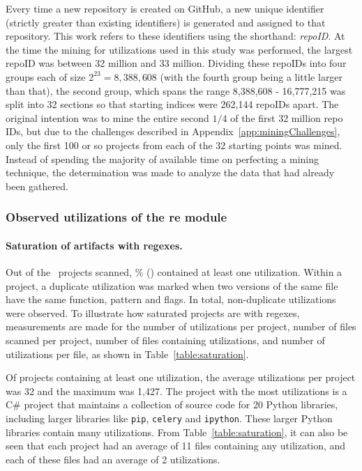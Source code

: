 Every time a new repository is created on GitHub, a new unique identifier (strictly greater than existing identifiers) is generated and assigned to that repository.  This work refers to these identifiers using the shorthand: \emph{repoID}.  At the time the mining for utilizations used in this study was performed, the largest repoID was between 32 million and 33 million.  Dividing these repoIDs into four groups each of size $2^{23} = 8,388,608$ (with the fourth group being a little larger than that), the second group, which spans the range 8,388,608 - 16,777,215 was split into 32 sections so that starting indices were 262,144 repoIDs apart.  The original intention was to mine the entire second $1/4$ of the first 32 million repo IDs, but due to the challenges described in Appendix~\ref{app:miningChallenges}, only the first 100 or so projects from each of the 32 starting points was mined.  Instead of spending the majority of available time on perfecting a mining technique, the determination was made to analyze the data that had already been gathered.

\subsubsection{Observed utilizations of the re module}
\paragraph{Saturation of artifacts with regexes.} Out of the \ projects scanned, \% () contained at least one utilization.  Within a project, a duplicate utilization was marked when two versions of the same file have the same function, pattern and flags.  In total,  non-duplicate utilizations were observed.  To illustrate how saturated projects are with regexes, measurements are made for the number of utilizations per project, number of files scanned per project, number of files containing utilizations, and number of utilizations  per file, as shown in Table~\ref{table:saturation}.

Of projects containing at least one utilization, the average utilizations per project was 32 and the maximum  was 1,427.  The project with the most utilizations is a C\# project that maintains a collection of source code for 20 Python libraries, including larger libraries like {\tt pip}, {\tt celery} and {\tt ipython}.  These larger Python libraries contain many utilizations.
From Table~\ref{table:saturation}, it can also be seen that each project had an average of 11 files containing any utilization, and each of these files had an average of 2 utilizations.

